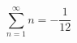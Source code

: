 \documentclass[a4paper]{article}
\begin{document}
\[\sum_{n=1}^\infty n=-\frac1{12}\]
\end{document}
